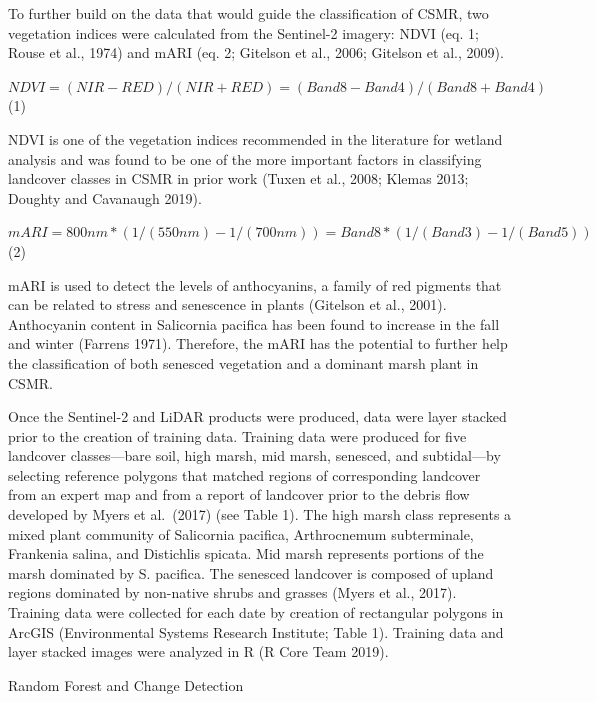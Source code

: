 \documentclass[
]{article}
\begin{document}
To further build on the data that would guide the classification of
CSMR, two vegetation indices were calculated from the Sentinel-2
imagery: NDVI (eq. 1; Rouse et al., 1974) and mARI (eq. 2; Gitelson et
al., 2006; Gitelson et al., 2009).

\(NDVI=(NIR-RED)/(NIR+RED)=(Band 8-Band 4)/(Band 8+Band 4)\) (1)

NDVI is one of the vegetation indices recommended in the literature for
wetland analysis and was found to be one of the more important factors
in classifying landcover classes in CSMR in prior work (Tuxen et al.,
2008; Klemas 2013; Doughty and Cavanaugh 2019).

\(mARI=800 nm*(1/(550 nm)-1/(700 nm))= Band 8*(1/(Band 3)-1/(Band 5))\)
(2)

mARI is used to detect the levels of anthocyanins, a family of red
pigments that can be related to stress and senescence in plants
(Gitelson et al., 2001). Anthocyanin content in Salicornia pacifica has
been found to increase in the fall and winter (Farrens 1971). Therefore,
the mARI has the potential to further help the classification of both
senesced vegetation and a dominant marsh plant in CSMR.

Once the Sentinel-2 and LiDAR products were produced, data were layer
stacked prior to the creation of training data. Training data were
produced for five landcover classes---bare soil, high marsh, mid marsh,
senesced, and subtidal---by selecting reference polygons that matched
regions of corresponding landcover from an expert map and from a report
of landcover prior to the debris flow developed by Myers et al.~(2017)
(see Table 1). The high marsh class represents a mixed plant community
of Salicornia pacifica, Arthrocnemum subterminale, Frankenia salina, and
Distichlis spicata. Mid marsh represents portions of the marsh dominated
by S. pacifica. The senesced landcover is composed of upland regions
dominated by non-native shrubs and grasses (Myers et al., 2017).
Training data were collected for each date by creation of rectangular
polygons in ArcGIS (Environmental Systems Research Institute; Table 1).
Training data and layer stacked images were analyzed in R (R Core Team
2019).

Random Forest and Change Detection
\end{document}
